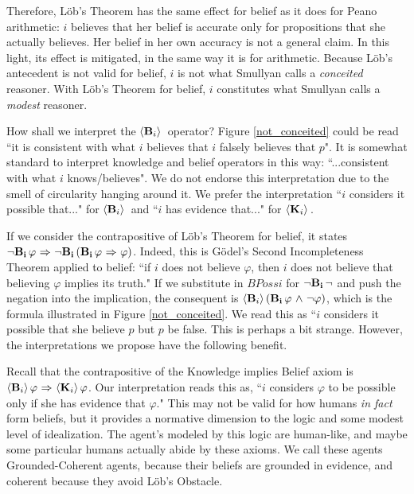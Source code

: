 Therefore, L\"ob's Theorem has the same effect for belief as it does for Peano arithmetic: $i$ believes that her belief is accurate only for propositions that she actually believes. Her belief in her own accuracy is not a general claim. In this light, its effect is mitigated, in the same way it is for arithmetic. Because L\"ob's antecedent is not valid for belief, $i$ is not what Smullyan calls a \emph{conceited} reasoner. With L\"ob's Theorem for belief, $i$ constitutes what Smullyan calls a \emph{modest} reasoner.

How shall we interpret the $\langle \mathbf{B}_{i} \rangle\,$ operator? Figure \ref{not_conceited} could be read ``it is consistent with what $i$ believes that $i$ falsely believes that $p$". It is somewhat standard to interpret knowledge and belief operators in this way: ``...consistent with what $i$ knows/believes".  We do not endorse this interpretation due to the smell of circularity hanging around it. We prefer the interpretation ``$i$ considers it possible that..." for $\langle \mathbf{B}_{i} \rangle\,$ and ``$i$ has evidence that..." for $\langle \mathbf{K}_{i} \rangle\,$. 

If we consider the contrapositive of L\"ob's Theorem for belief, it states ${\neg} \mathbf{B}_{\mathbf{i}}\, \varphi {\ \Rightarrow \ } {\neg}\mathbf{B}_{\mathbf{i}}\,(\mathbf{B}_{\mathbf{i}}\, \varphi {\ \Rightarrow \ } \varphi)$. Indeed, this is G\"odel's Second Incompleteness Theorem applied to belief: ``if $i$ does not believe $\varphi$, then $i$ does not believe that believing $\varphi$ implies its truth." If we substitute in $BPoss{i}$ for ${\neg}\mathbf{B}_{\mathbf{i}}\,{\neg}$ and push the negation into the implication, the consequent is $\langle \mathbf{B}_{i} \rangle\,(\mathbf{B}_{\mathbf{i}}\,\varphi {\ \wedge \ } {\neg} \varphi)$, which is the formula illustrated in Figure \ref{not_conceited}. We read this as ``$i$ considers it possible that she believe $p$ but $p$ be false. This is perhaps a bit strange. However, the interpretations we propose have the following benefit.

Recall that the contrapositive of the Knowledge implies Belief axiom is $\langle \mathbf{B}_{i} \rangle\,\varphi {\ \Rightarrow \ } \langle \mathbf{K}_{i} \rangle\,\varphi$. Our interpretation reads this as, ``$i$ considers $\varphi$ to be possible only if she has evidence that $\varphi$."  This may not be valid for how humans \emph{in fact} form beliefs, but it provides a normative dimension to the logic and some modest level of idealization. The agent's modeled by this logic are human-like, and maybe some particular humans actually abide by these axioms. We call these agents Grounded-Coherent agents, because their beliefs are grounded in evidence, and coherent because they avoid L\"ob's Obstacle.

